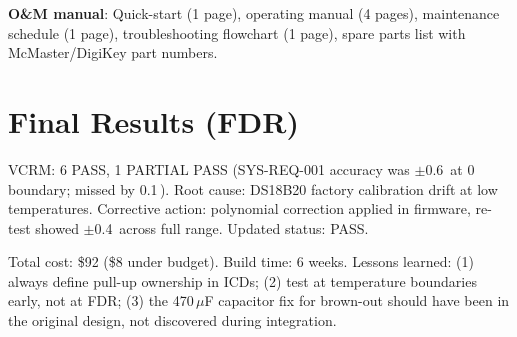 \textbf{O\&M manual}: Quick-start (1 page), operating manual (4 pages), maintenance schedule (1 page), troubleshooting flowchart (1 page), spare parts list with McMaster/DigiKey part numbers.

\section*{Final Results (FDR)}
VCRM: 6 PASS, 1 PARTIAL PASS (SYS-REQ-001 accuracy was $\pm$0.6\,\degC{} at 0\,\degC{} boundary; missed by 0.1\,\degC{}). Root cause: DS18B20 factory calibration drift at low temperatures. Corrective action: polynomial correction applied in firmware, re-test showed $\pm$0.4\,\degC{} across full range. Updated status: PASS.

Total cost: \$92 (\$8 under budget). Build time: 6 weeks. Lessons learned: (1) always define pull-up ownership in ICDs; (2) test at temperature boundaries early, not at FDR; (3) the 470\,$\mu$F capacitor fix for brown-out should have been in the original design, not discovered during integration.

